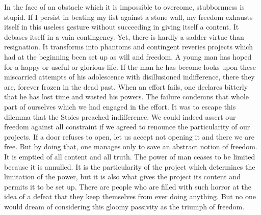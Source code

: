 \documentclass[11pt]{article}
\begin{document}
In the face of an obstacle which it is impossible to overcome, stubbornness is stupid. If I persist in beating my fist against a stone wall, my freedom exhausts itself in this useless gesture without succeeding in giving itself a content. It debases itself in a vain contingency. Yet, there is hardly a sadder virtue than resignation. It transforms into phantoms and contingent reveries projects which had at the beginning been set up as will and freedom. A young man has hoped for a happy or useful or glorious life. If the man he has become looks upon these miscarried attempts of his adolescence with disillusioned indifference, there they are, forever frozen in the dead past. When an effort fails, one declares bitterly that he has lost time and wasted his powers. The failure condemns that whole part of ourselves which we had engaged in the effort. It was to escape this dilemma that the Stoics preached indifference. We could indeed assert our freedom against all constraint if we agreed to renounce the particularity of our projects. If a door refuses to open, let us accept not opening it and there we are free. But by doing that, one manages only to save an abstract notion of freedom. It is emptied of all content and all truth. The power of man ceases to be limited because it is annulled. It is the particularity of the project which determines the limitation of the power, but it is also what gives the project its content and permits it to be set up. There are people who are filled with such horror at the idea of a defeat that they keep themselves from ever doing anything. But no one would dream of considering this gloomy passivity as the triumph of freedom.
\end{document}
